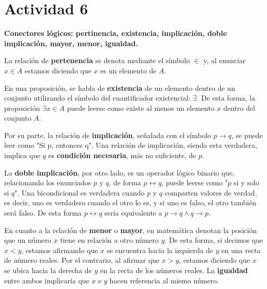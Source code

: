 \section*{Actividad 6}
\textbf{Conectores lógicos: pertinencia, existencia, implicación, doble implicación, mayor, menor, igualdad.}

La relación de \textbf{pertenencia} se denota mediante el símbolo $\in$ y, al enunciar $x \in A$ estamos diciendo que $x$ es un elemento de $A$.

En una proposición, se habla de \textbf{existencia} de un elemento dentro de un conjunto utilizando el símbolo del cuantificador existencial: $\exists$. De esta forma, la proposición $\exists x \in A$ puede leerse como existe al menos un elemento $x$ dentro del conjunto $A$.

Por su parte, la relación de \textbf{implicación}, señalada con el símbolo $p \rightarrow q$, se puede leer como "Si p, entonces q". Una relación de implicación, siendo esta verdadera, implica que $q$ es \textbf{condición necesaria}, más no suficiente, de $p$. 

La \textbf{doble implicación}, por otro lado, es un operador lógico binario que, relacionando los enunciados $p$ y $q$, de forma $p \leftrightarrow q$, puede leerse como "$p$ si y solo si $q$". Una bicondicional es verdadera cuando $p$ y $q$ comparten valores de verdad, es decir, uno es verdadero cuando el otro lo es, y si uno es falso, el otro también será falso. De esta forma $p \leftrightarrow q$ sería equivalente a $p \rightarrow q \wedge q \rightarrow p$. 

En cuanto a la relación de \textbf{menor} o \textbf{mayor}, en matemática denotan la posición que un número $x$ tiene en relación a otro número $y$. De esta forma, si decimos que $x < y$, estamos afirmando que $x$ se encuentra hacia la izquierda de $y$ en una recta de número reales. Por el contrario, al afirmar que $x > y$, estamos diciendo que $x$ se ubica hacia la derecha de $y$ en la recta de los números reales. La \textbf{igualdad} entre ambos implicaría que $x$ e $y$ hacen referencia al mismo número.
